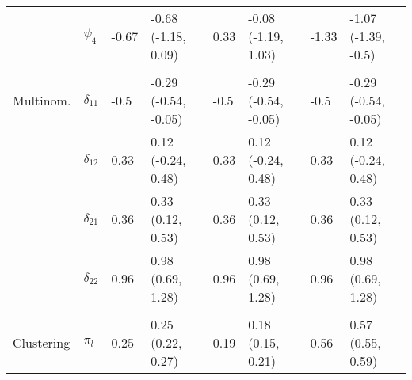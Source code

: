 \documentclass[]{article}
\begin{document}
\begin{table}[t]
\begin{tabular}{llllllll}
\hspace{1em} & $\psi_{4}$ & -0.67 & -0.68 (-1.18, 0.09) & 0.33 & -0.08 (-1.19, 1.03) & -1.33 & -1.07 (-1.39, -0.5)\\
\addlinespace[0.3em]
\multicolumn{8}{l}{\textbf{ }}\\
\hspace{1em}Multinom. & $\delta_{11}$ & -0.5 & -0.29 (-0.54, -0.05) & -0.5 & -0.29 (-0.54, -0.05) & -0.5 & -0.29 (-0.54, -0.05)\\
\hspace{1em} & $\delta_{12}$ & 0.33 & 0.12 (-0.24, 0.48) & 0.33 & 0.12 (-0.24, 0.48) & 0.33 & 0.12 (-0.24, 0.48)\\
\hspace{1em} & $\delta_{21}$ & 0.36 & 0.33 (0.12, 0.53) & 0.36 & 0.33 (0.12, 0.53) & 0.36 & 0.33 (0.12, 0.53)\\
\hspace{1em} & $\delta_{22}$ & 0.96 & 0.98 (0.69, 1.28) & 0.96 & 0.98 (0.69, 1.28) & 0.96 & 0.98 (0.69, 1.28)\\
\addlinespace[0.3em]
\multicolumn{8}{l}{\textbf{ }}\\
\hspace{1em}Clustering & $\pi_l$ & 0.25 & 0.25 (0.22, 0.27) & 0.19 & 0.18 (0.15, 0.21) & 0.56 & 0.57 (0.55, 0.59)\\
\bottomrule
\end{tabular}
\end{table}
\end{document}
